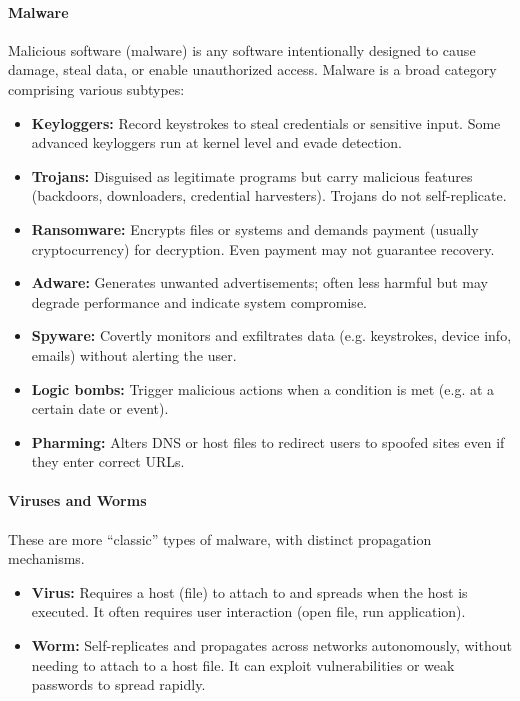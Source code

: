 \documentclass[12pt,a4paper]{report}
\begin{document}
\paragraph{Malware}
Malicious software (malware) is any software intentionally designed to cause damage, steal data, or enable unauthorized access. Malware is a broad category comprising various subtypes: 
\begin{itemize}
  \item \textbf{Keyloggers:} Record keystrokes to steal credentials or sensitive input. Some advanced keyloggers run at kernel level and evade detection.   
  \item \textbf{Trojans:} Disguised as legitimate programs but carry malicious features (backdoors, downloaders, credential harvesters). Trojans do not self-replicate.   
  \item \textbf{Ransomware:} Encrypts files or systems and demands payment (usually cryptocurrency) for decryption. Even payment may not guarantee recovery.   
  \item \textbf{Adware:} Generates unwanted advertisements; often less harmful but may degrade performance and indicate system compromise. 
  \item \textbf{Spyware:} Covertly monitors and exfiltrates data (e.g. keystrokes, device info, emails) without alerting the user.   
  \item \textbf{Logic bombs:} Trigger malicious actions when a condition is met (e.g. at a certain date or event).   
  \item \textbf{Pharming:} Alters DNS or host files to redirect users to spoofed sites even if they enter correct URLs.   
\end{itemize}

\paragraph{Viruses and Worms}
These are more “classic” types of malware, with distinct propagation mechanisms.  
\begin{itemize}
  \item \textbf{Virus:} Requires a host (file) to attach to and spreads when the host is executed. It often requires user interaction (open file, run application).   
  \item \textbf{Worm:} Self-replicates and propagates across networks autonomously, without needing to attach to a host file. It can exploit vulnerabilities or weak passwords to spread rapidly.   
\end{itemize}
\end{document}
